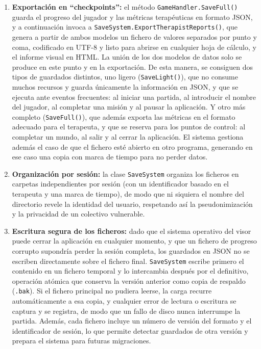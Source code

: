 \documentclass[12pt,twoside,titlepage]{report}
\begin{document}
\begin{enumerate}[label=\textbf{\arabic*.}, leftmargin=1.5cm, itemsep=0.5em]
  \item \textbf{Exportación en ``checkpoints'':} el método \texttt{GameHandler.SaveFull()} guarda el progreso del jugador y las métricas terapéuticas en formato JSON, y a continuación invoca a \texttt{SaveSystem.ExportTherapistReports()}, que genera a partir de ambos modelos un fichero de valores separados por punto y coma, codificado en UTF-8 y listo para abrirse en cualquier hoja de cálculo, y el informe visual en HTML.
  La unión de los dos modelos de datos solo se produce en este punto y en la exportación.
  De esta manera, se consiguen dos tipos de guardados distintos, uno ligero (\texttt{SaveLight()}), que no consume muchos recursos y guarda únicamente la información en JSON, y que se ejecuta ante eventos frecuentes: al iniciar una partida, al introducir el nombre del jugador, al completar una misión y al pausar la aplicación.
  Y otro más completo (\texttt{SaveFull()}), que además exporta las métricas en el formato adecuado para el terapeuta, y que se reserva para los puntos de control: al completar un mundo, al salir y al cerrar la aplicación.
  El sistema gestiona además el caso de que el fichero esté abierto en otro programa, generando en ese caso una copia con marca de tiempo para no perder datos.
  \item \textbf{Organización por sesión:} la clase \texttt{SaveSystem} organiza los ficheros en carpetas independientes por sesión (con un identificador basado en el terapeuta y una marca de tiempo), de modo que ni siquiera el nombre del directorio revele la identidad del usuario, respetando así la pseudonimización y la privacidad de un colectivo vulnerable.
  \item \textbf{Escritura segura de los ficheros:} dado que el sistema operativo del visor puede cerrar la
  aplicación en cualquier momento, y que un fichero de progreso corrupto supondría perder la sesión completa, los
  guardados en JSON no se escriben directamente sobre el fichero final. \texttt{SaveSystem} escribe primero el
  contenido en un fichero temporal y lo intercambia después por el definitivo, operación atómica que conserva
  la versión anterior como copia de respaldo (\texttt{.bak}). Si el fichero principal no pudiera leerse, la
  carga recurre automáticamente a esa copia, y cualquier error de lectura o escritura se captura y se registra,
  de modo que un fallo de disco nunca interrumpe la partida. Además, cada fichero incluye un número de versión
  del formato y el identificador de sesión, lo que permite detectar guardados de otra versión y prepara el sistema para futuras migraciones.
\end{enumerate}
\end{document}
